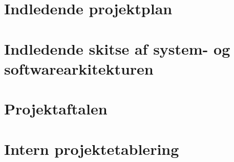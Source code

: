 \documentclass[a4paper,12pt]{article}
\begin{document}
\section{Indledende projektplan}

\section{Indledende skitse af system- og softwarearkitekturen}

\section{Projektaftalen}

\section{Intern projektetablering}
\end{document}

